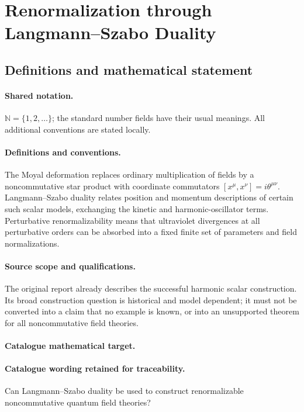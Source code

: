\documentclass[11pt]{article}
\begin{document}
\section{Renormalization through Langmann–Szabo Duality}\label{statement}

\subsection{Definitions and mathematical statement}

\paragraph{Shared notation.}$\mathbb N=\{1,2,\ldots\}$; the standard number fields have their usual meanings. All additional conventions are stated locally.


\paragraph{Definitions and conventions.} The Moyal deformation replaces ordinary multiplication of fields by a noncommutative star product with coordinate commutators $[x^\mu,x^\nu]=i\theta^{\mu\nu}$. Langmann--Szabo duality relates position and momentum descriptions of certain such scalar models, exchanging the kinetic and harmonic-oscillator terms. Perturbative renormalizability means that ultraviolet divergences at all perturbative orders can be absorbed into a fixed finite set of parameters and field normalizations.

\paragraph{Source scope and qualifications.} The original report already describes the successful harmonic scalar construction. Its broad construction question is historical and model dependent; it must not be converted into a claim that no example is known, or into an unsupported theorem for all noncommutative field theories.

\paragraph{Catalogue mathematical target.}
\paragraph{Catalogue wording retained for traceability.}
Can Langmann–Szabo duality be used to construct renormalizable noncommutative quantum field theories?
\end{document}
